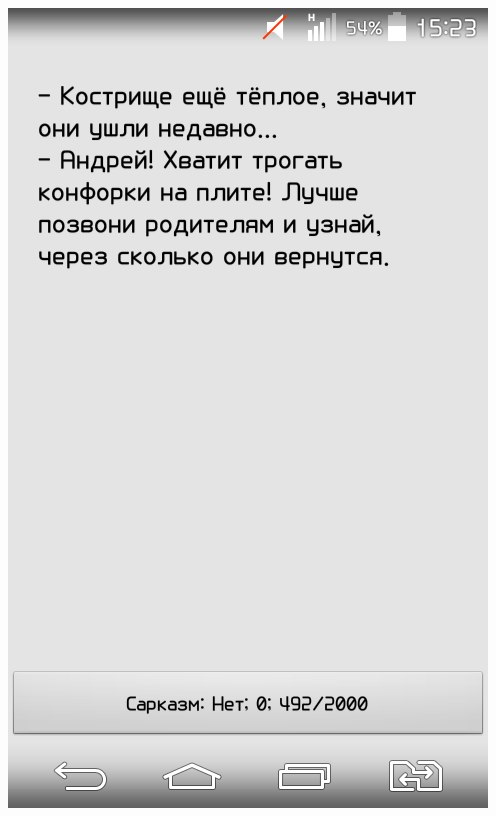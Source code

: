 \documentclass[t]{beamer}
\begin{document}
\begin{frame}
{			\includegraphics[scale = 0.17]{images/Bash2.jpg}
}
\end{frame}
\end{document}

